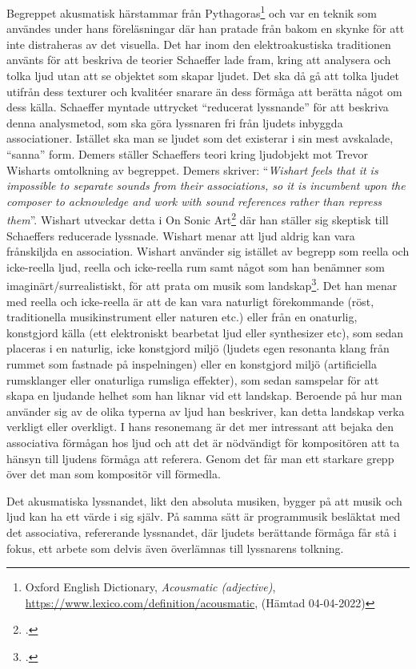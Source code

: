 \documentclass{article}
\begin{document}
Begreppet akusmatisk härstammar från Pythagoras\footnote{Oxford English Dictionary, \emph{Acousmatic
(adjective)}, \url{https://www.lexico.com/definition/acousmatic}, (Hämtad 04-04-2022)} och var en teknik som
användes under hans föreläsningar där han pratade från bakom en skynke för att inte distraheras av det
visuella. Det har inom den elektroakustiska traditionen använts för att beskriva de
teorier Schaeffer lade fram, kring att analysera och tolka ljud utan att se objektet som skapar ljudet.
Det ska då gå att tolka ljudet utifrån dess texturer och kvalitéer snarare än dess förmåga att berätta något om dess
källa. Schaeffer myntade uttrycket ``reducerat lyssnande'' för att beskriva denna analysmetod, som ska göra
lyssnaren fri från ljudets inbyggda associationer. Istället ska man se ljudet som det existerar i sin mest
avskalade, ``sanna'' form. Demers ställer Schaeffers teori kring ljudobjekt mot Trevor Wisharts omtolkning av
begreppet. Demers skriver: ``\emph{Wishart feels that it is impossible to separate sounds from their
associations, so it is incumbent upon the composer to acknowledge and work with sound references rather than
repress them}''. Wishart utveckar detta i On Sonic Art\footcite{TrevorWishart} där han ställer sig skeptisk 
till Schaeffers reducerade lyssnade. Wishart menar att ljud aldrig kan vara frånskiljda en association.
Wishart använder sig istället av begrepp som reella och icke-reella ljud, reella och icke-reella rum samt
något som han benämner som imaginärt/surrealistiskt, för att prata om musik som
landskap\footcite[144-147]{TrevorWishart}. Det han menar med reella och icke-reella är att de kan vara
naturligt förekommande (röst, traditionella musikinstrument eller naturen etc.) eller från en onaturlig,
konstgjord källa (ett elektroniskt bearbetat ljud eller synthesizer etc), som sedan placeras i en naturlig,
icke konstgjord miljö (ljudets egen resonanta klang från rummet som fastnade på inspelningen) eller en
konstgjord miljö (artificiella rumsklanger eller onaturliga rumsliga effekter), som sedan samspelar för att
skapa en ljudande helhet som han liknar vid ett landskap. Beroende på hur man använder sig av de olika
typerna av ljud han beskriver, kan detta landskap verka verkligt eller overkligt. I hans resonemang är det mer
intressant att bejaka den associativa förmågan hos ljud och att det är nödvändigt för kompositören att ta hänsyn
till ljudens förmåga att referera. Genom det får man ett starkare grepp över det man som kompositör vill förmedla.

Det akusmatiska lyssnandet, likt den absoluta musiken, bygger på att musik och ljud kan ha ett värde i sig själv. 
På samma sätt är programmusik besläktat med det associativa, refererande lyssnandet, där ljudets berättande
förmåga får stå i fokus, ett arbete som delvis även överlämnas till lyssnarens tolkning.
\end{document}
